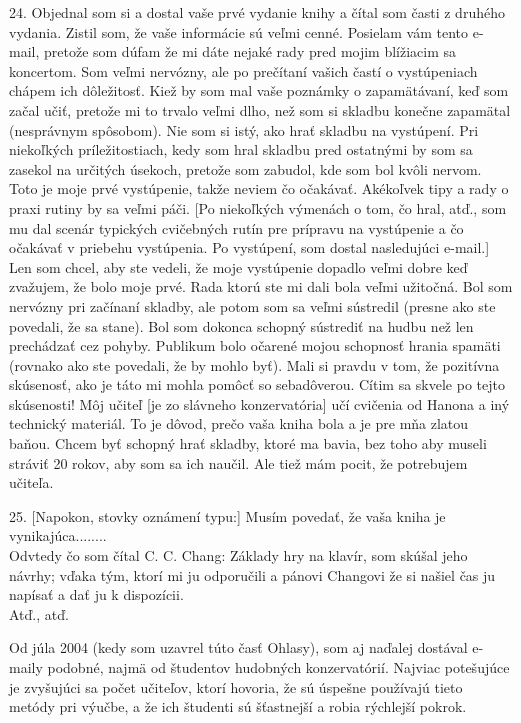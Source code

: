 24. Objednal som si a dostal vaše prvé vydanie knihy a čítal som časti z druhého vydania. Zistil som, že vaše informácie sú veľmi cenné. Posielam vám tento e-mail, pretože som dúfam že mi dáte nejaké rady pred mojim blížiacim sa koncertom. Som veľmi nervózny, ale po prečítaní vašich častí o vystúpeniach chápem ich dôležitosť. Kiež by som mal vaše poznámky o zapamätávaní, keď som začal učiť, pretože mi to trvalo veľmi dlho, než som si skladbu konečne zapamätal (nesprávnym spôsobom). Nie som si istý, ako hrať skladbu na vystúpení. Pri niekoľkých príležitostiach, kedy som hral skladbu pred ostatnými by som sa zasekol na určitých úsekoch, pretože som zabudol, kde som bol kvôli nervom. Toto je moje prvé vystúpenie, takže neviem čo očakávať. Akékoľvek tipy a rady o praxi rutiny by sa veľmi páči.
[Po niekoľkých výmenách o tom, čo hral, atď., som mu dal scenár typických cvičebných rutín pre prípravu na vystúpenie a čo očakávať v priebehu vystúpenia. Po vystúpení, som dostal nasledujúci e-mail.]
Len som chcel, aby ste vedeli, že moje vystúpenie dopadlo veľmi dobre keď zvažujem, že bolo moje prvé. Rada ktorú ste mi dali bola veľmi užitočná. Bol som nervózny pri začínaní skladby, ale potom som sa veľmi sústredil (presne ako ste povedali, že sa stane). Bol som dokonca schopný sústrediť na hudbu než len prechádzať cez pohyby. Publikum bolo očarené mojou schopnosť hrania spamäti (rovnako ako ste povedali, že by mohlo byť). Mali si pravdu v tom, že pozitívna skúsenosť, ako je táto mi mohla pomôcť so sebadôverou. Cítim sa skvele po tejto skúsenosti! Môj učiteľ [je zo slávneho konzervatória] učí cvičenia od Hanona a iný technický materiál. To je dôvod, prečo vaša kniha bola a je pre mňa zlatou baňou. Chcem byť schopný hrať skladby, ktoré ma bavia, bez toho aby museli stráviť 20 rokov, aby som sa ich naučil. Ale tiež mám pocit, že potrebujem učiteľa.
\medskip

25. [Napokon, stovky oznámení typu:]
Musím povedať, že vaša kniha je vynikajúca{\noligatures ........} \\
Odvtedy čo som čítal C. C. Chang: Základy hry na klavír, som skúšal jeho návrhy; vďaka tým, ktorí mi ju odporučili a pánovi Changovi že si našiel čas ju napísať a dať ju k dispozícii. \\
Atď., atď.
\medskip

Od júla 2004 (kedy som uzavrel túto časť Ohlasy), som aj naďalej dostával e-maily podobné, najmä od študentov hudobných konzervatórií. Najviac potešujúce je zvyšujúci sa počet učiteľov, ktorí hovoria, že sú úspešne používajú tieto metódy pri výučbe, a že ich študenti sú šťastnejší a robia rýchlejší pokrok. 

